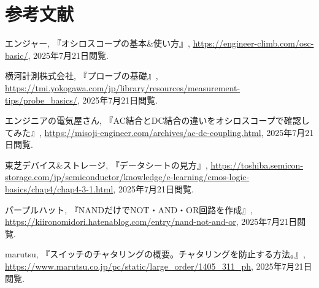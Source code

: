 \documentclass[uplatex, a4j, dvipdfmx]{jsarticle}
\begin{document}
\section{参考文献}
\begin{thebibliography}{9}

    エンジャー, 『オシロスコープの基本\&使い方』,
    \url{https://engineer-climb.com/osc-basic/}, 2025年7月21日閲覧.

    横河計測株式会社, 『プローブの基礎』, 
    \url{https://tmi.yokogawa.com/jp/library/resources/measurement-tips/probe_basics/}, 
    2025年7月21日閲覧.

    エンジニアの電気屋さん, 『AC結合とDC結合の違いをオシロスコープで確認してみた』,
    \url{https://misoji-engineer.com/archives/ac-dc-coupling.html}, 
    2025年7月21日閲覧.

    東芝デバイス\&ストレージ, 『データシートの見方』,
    \url{https://toshiba.semicon-storage.com/jp/semiconductor/knowledge/e-learning/cmos-logic-basics/chap4/chap4-3-1.html}, 2025年7月21日閲覧.

    パープルハット, 『NANDだけでNOT・AND・OR回路を作成』,
    \url{https://kiironomidori.hatenablog.com/entry/nand-not-and-or}, 2025年7月21日閲覧.

    marutsu, 『スイッチのチャタリングの概要。チャタリングを防止する方法。』,
    \url{https://www.marutsu.co.jp/pc/static/large_order/1405_311_ph}, 2025年7月21日閲覧.
\end{thebibliography}
\end{document}
